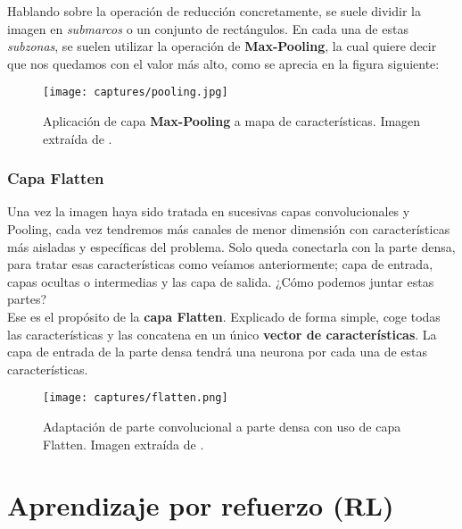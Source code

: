 \documentclass[11pt,fleqn]{book} %
\begin{document}
Hablando sobre la operación de reducción concretamente, se suele dividir la imagen en \textit{submarcos} o un conjunto de rectángulos. En cada una de estas \textit{subzonas}, se suelen utilizar la operación de \textbf{Max-Pooling}, la cual quiere decir que nos quedamos con el valor más alto, como se aprecia en la figura siguiente:

\begin{figure}[H]
	\centering\texttt{[image: captures/pooling.jpg]}
	\caption{Aplicación de capa \textbf{Max-Pooling} a mapa de características. Imagen extraída de \cite{article:convimagen2}.}
	\label{fig:pooling} %
\end{figure}

\subsection{Capa Flatten}\label{sec:flatten}

Una vez la imagen haya sido tratada en sucesivas capas convolucionales y Pooling, cada vez tendremos más canales de menor dimensión con características más aisladas y específicas del problema. Solo queda conectarla con la parte densa, para tratar esas características como veíamos anteriormente; capa de entrada, capas ocultas o intermedias y las capa de salida. ¿Cómo podemos juntar estas partes? \\

Ese es el propósito de la \textbf{capa Flatten}. Explicado de forma simple, coge todas las características y las concatena en un único \textbf{vector de características}. La capa de entrada de la parte densa tendrá una neurona por cada una de estas características.

\begin{figure}[H]
	\centering\texttt{[image: captures/flatten.png]}
	\caption{Adaptación de parte convolucional a parte densa con uso de capa Flatten. Imagen extraída de \cite{article:convimagen3}.}
	\label{fig:flatten} %
\end{figure} 


\chapter{Aprendizaje por refuerzo (RL)}\label{sec:RL}
\end{document}
